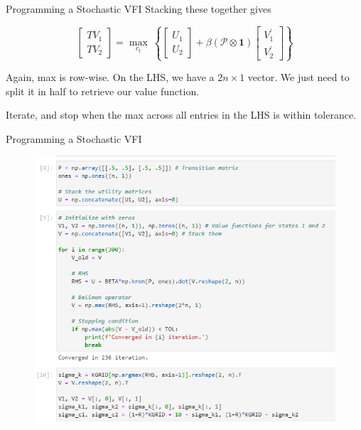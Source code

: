 \documentclass[11pt, xcolor={dvipsnames}, hyperref={colorlinks, allcolors=Blue}]{beamer}
\begin{document}
\begin{frame}{Programming a Stochastic VFI}
Stacking these together gives
\medskip

\[ 
\begin{bmatrix}TV_1 \\ TV_2 \end{bmatrix} = \underset{c_{t}}{\max} \ \left\{
\begin{bmatrix}U_1 \\ U_2 \end{bmatrix} + \beta (\mathcal{P} \otimes \mathbf{1})
\begin{bmatrix}V_{1}^{\prime} \\ V_{2}^{\prime}\end{bmatrix}
\right\}
\]
\bigskip

Again, max is row-wise. On the LHS, we have a $2n\times 1$ vector. We just need to split it in half to retrieve our value function.\bigskip

Iterate, and stop when the max across all entries in the LHS is within tolerance.
\end{frame}

\begin{frame}{Programming a Stochastic VFI}

\begin{figure}
	\includegraphics[height=0.8\paperheight]{Code6.png}
	\hfill
\end{figure}

\end{frame}
\end{document}
